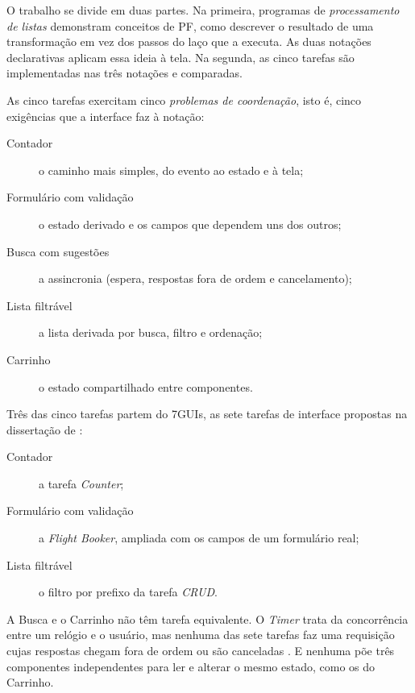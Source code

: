 O trabalho se divide em duas partes.
Na primeira, programas de \emph{processamento de listas} demonstram conceitos
de PF, como descrever o resultado de uma transformação em vez dos passos
do laço que a executa.
As duas notações declarativas aplicam essa ideia à tela.
Na segunda, as cinco tarefas são implementadas nas três notações e comparadas.

As cinco tarefas exercitam cinco \emph{problemas de coordenação}, isto é, cinco
exigências que a interface faz à notação:

\begin{description}
\item[{Contador}] o caminho mais simples, do evento ao estado e à tela;
\item[{Formulário com validação}] o estado derivado e os campos que dependem
uns dos outros;
\item[{Busca com sugestões}] a assincronia (espera, respostas fora de ordem e
cancelamento);
\item[{Lista filtrável}] a lista derivada por busca, filtro e ordenação;
\item[{Carrinho}] o estado compartilhado entre componentes.
\end{description}

Três das cinco tarefas partem do 7GUIs, as sete tarefas de interface
propostas na dissertação de \textcite[p. 17, 25 e 34]{kiss2014}:

\begin{description}
\item[{Contador}] a tarefa \emph{Counter};
\item[{Formulário com validação}] a \emph{Flight Booker}, ampliada com os campos de
um formulário real;
\item[{Lista filtrável}] o filtro por prefixo da tarefa \emph{CRUD}.
\end{description}

A Busca e o Carrinho não têm tarefa equivalente.
O \emph{Timer} trata da concorrência entre um relógio e o usuário, mas nenhuma
das sete tarefas faz uma requisição cujas respostas chegam fora de ordem ou
são canceladas \cite[p. 30]{kiss2014}.
E nenhuma põe três componentes independentes para ler e alterar o mesmo
estado, como os do Carrinho.

